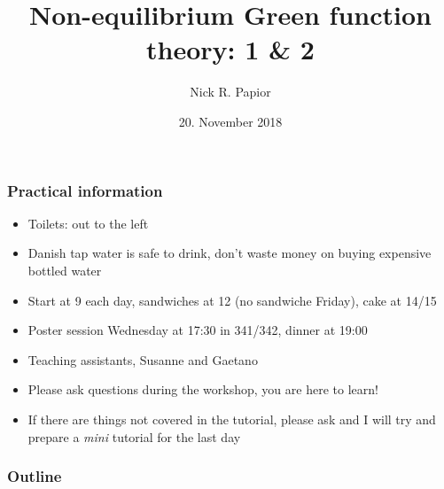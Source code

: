 


\graphicspath{{fig/}}
\usepackage[export]{adjustbox}


\date{20. November 2018}
\title{Non-equilibrium Green function theory: 1 \& 2}
\author{Nick R. Papior}




\begin{frame}
  \titlepage
\end{frame}

\begin{frame}
  \frametitle{Practical information}

  \small
  \begin{itemize}[<+->]
    
    \item Toilets: out to the left

    \item Danish tap water is safe to drink, don't waste money on buying expensive bottled
    water

    \item Start at 9 each day, sandwiches at 12 (no sandwiche Friday), cake at 14/15

    \item Poster session Wednesday at 17:30 in 341/342, dinner at 19:00

    \item Teaching assistants, Susanne and Gaetano

    \item Please ask questions during the workshop, you are here to learn!

    \item If there are things not covered in the tutorial, please ask and I will try and
    prepare a \emph{mini} tutorial for the last day

  \end{itemize}

  
\end{frame}

\begin{frame}
  \frametitle{Outline}
  \tableofcontents
\end{frame}










